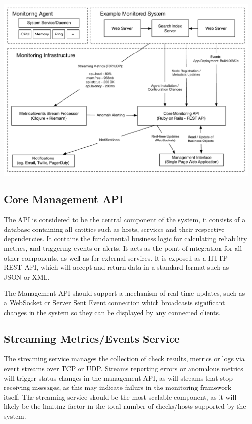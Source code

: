 \documentclass{cshonours}
\begin{document}
\begin{listing}[h]
  \centerline{
    \includegraphics[scale=0.6]{architecture.pdf}
  }
\end{listing}

\subsection{Core Management API}

The API is considered to be the central component of the system, it consists of a database containing all entities such as hosts, services and their respective dependencies. It contains the fundamental business logic for calculating reliability metrics, and triggering events or alerts. It acts as the point of integration for all other components, as well as for external services. It is exposed as a HTTP REST API, which will accept and return data in a standard format such as JSON or XML.

The Management API should support a mechanism of real-time updates, such as a WebSocket or Server Sent Event connection which broadcasts significant changes in the system so they can be displayed by any connected clients.

\subsection{Streaming Metrics/Events Service}

The streaming service manages the collection of check results, metrics or logs via event streams over TCP or UDP\@. Streams reporting errors or anomalous metrics will trigger status changes in the management API, as will streams that stop receiving messages, as this may indicate failure in the monitoring framework itself. The streaming service should be the most scalable component, as it will likely be the limiting factor in the total number of checks/hosts supported by the system.
\end{document}
